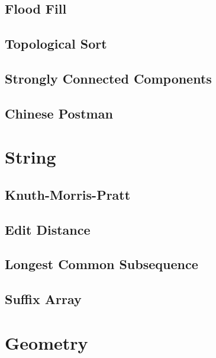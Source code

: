 \documentclass[a4paper,landscape,8pt]{article}
\begin{document}
\begin{multicols}{2}
\subsection{Flood Fill}


\subsection{Topological Sort}


\subsection{Strongly Connected Components}


\subsection{Chinese Postman}



\section{String}

\subsection{Knuth-Morris-Pratt}


\subsection{Edit Distance}


\subsection{Longest Common Subsequence}


\subsection{Suffix Array}



\section{Geometry}


\end{multicols}
\end{document}
